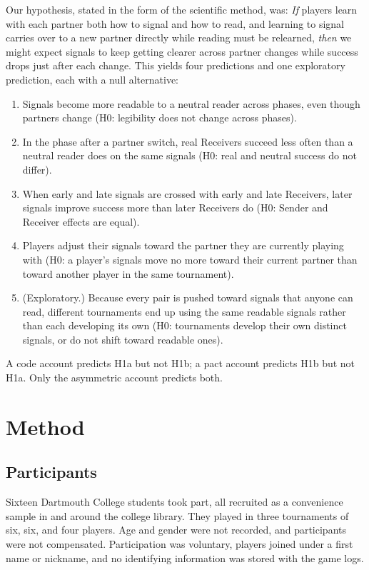 \documentclass[stu,11pt,floatsintext,donotrepeattitle]{apa7}
\begin{document}
Our hypothesis, stated in the form of the scientific method, was: \emph{If} players learn with each partner both how to signal and how to read, and learning to signal carries over to a new partner directly while reading must be relearned, \emph{then} we might expect signals to keep getting clearer across partner changes while success drops just after each change. This yields four predictions and one exploratory prediction, each with a null alternative:
\begin{enumerate}
\item[H1a.] Signals become more readable to a neutral reader across phases, even though partners change (H0: legibility does not change across phases).
\item[H1b.] In the phase after a partner switch, real Receivers succeed less often than a neutral reader does on the same signals (H0: real and neutral success do not differ).
\item[H1c.] When early and late signals are crossed with early and late Receivers, later signals improve success more than later Receivers do (H0: Sender and Receiver effects are equal).
\item[H1d.] Players adjust their signals toward the partner they are currently playing with (H0: a player's signals move no more toward their current partner than toward another player in the same tournament).
\item[H1e.] (Exploratory.) Because every pair is pushed toward signals that anyone can read, different tournaments end up using the same readable signals rather than each developing its own (H0: tournaments develop their own distinct signals, or do not shift toward readable ones).
\end{enumerate}
A code account predicts H1a but not H1b; a pact account predicts H1b but not H1a. Only the asymmetric account predicts both.

\section{Method}

\subsection{Participants}

Sixteen Dartmouth College students took part, all recruited as a convenience sample in and around the college library. They played in three tournaments of six, six, and four players.
Age and gender were not recorded, and participants were not compensated.
Participation was voluntary, players joined under a first name or nickname, and no identifying information was stored with the game logs.
\end{document}
